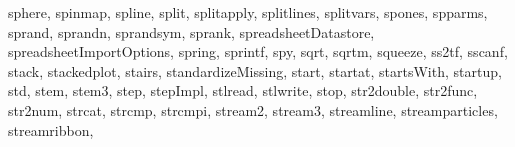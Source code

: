 {{        sphere,%
        spinmap,%
        spline,%
        split,%
        splitapply,%
        splitlines,%
        splitvars,%
        spones,%
        spparms,%
        sprand,%
        sprandn,%
        sprandsym,%
        sprank,%
        spreadsheetDatastore,%
        spreadsheetImportOptions,%
        spring,%
        sprintf,%
        spy,%
        sqrt,%
        sqrtm,%
        squeeze,%
        ss2tf,%
        sscanf,%
        stack,%
        stackedplot,%
        stairs,%
        standardizeMissing,%
        start,%
        startat,%
        startsWith,%
        startup,%
        std,%
        stem,%
        stem3,%
        step,%
        stepImpl,%
        stlread,%
        stlwrite,%
        stop,%
        str2double,%
        str2func,%
        str2num,%
        strcat,%
        strcmp,%
        strcmpi,%
        stream2,%
        stream3,%
        streamline,%
        streamparticles,%
        streamribbon,%
}}
